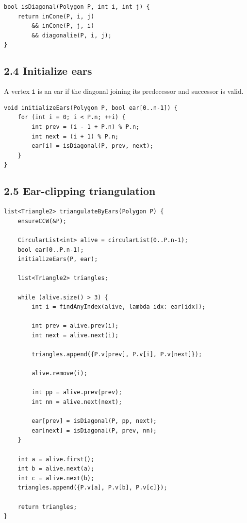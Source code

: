 \documentclass[11pt]{article}
\begin{document}
\begin{verbatim}
bool isDiagonal(Polygon P, int i, int j) {
    return inCone(P, i, j)
        && inCone(P, j, i)
        && diagonalie(P, i, j);
}
\end{verbatim}

\subsection{2.4 Initialize ears}\label{initialize-ears}

A vertex \texttt{i} is an ear if the diagonal joining
its predecessor and successor is valid.

\begin{verbatim}
void initializeEars(Polygon P, bool ear[0..n-1]) {
    for (int i = 0; i < P.n; ++i) {
        int prev = (i - 1 + P.n) % P.n;
        int next = (i + 1) % P.n;
        ear[i] = isDiagonal(P, prev, next);
    }
}
\end{verbatim}

\subsection{2.5 Ear-clipping
triangulation}\label{ear-clipping-triangulation}

\begin{verbatim}
list<Triangle2> triangulateByEars(Polygon P) {
    ensureCCW(&P);

    CircularList<int> alive = circularList(0..P.n-1);
    bool ear[0..P.n-1];
    initializeEars(P, ear);

    list<Triangle2> triangles;

    while (alive.size() > 3) {
        int i = findAnyIndex(alive, lambda idx: ear[idx]);

        int prev = alive.prev(i);
        int next = alive.next(i);

        triangles.append({P.v[prev], P.v[i], P.v[next]});

        alive.remove(i);

        int pp = alive.prev(prev);
        int nn = alive.next(next);

        ear[prev] = isDiagonal(P, pp, next);
        ear[next] = isDiagonal(P, prev, nn);
    }

    int a = alive.first();
    int b = alive.next(a);
    int c = alive.next(b);
    triangles.append({P.v[a], P.v[b], P.v[c]});

    return triangles;
}
\end{verbatim}
\end{document}
